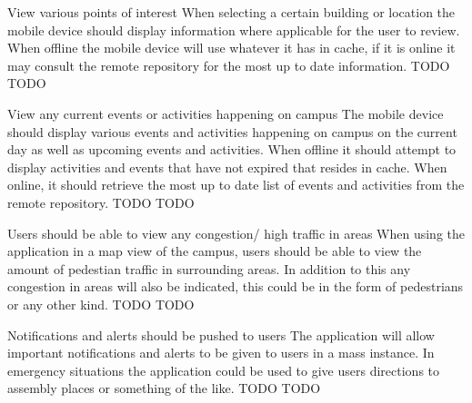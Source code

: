 \FuncReq
{View various points of interest}
{When selecting a certain building or location the mobile device should display information where applicable for the user to review. When offline the mobile device will use whatever it has in cache, if it is online it may consult the remote repository for the most up to date information.}
{TODO}
{TODO}

\FuncReq
{View any current events or activities happening on campus}
{The mobile device should display various events and activities happening on campus on the current day as well as upcoming events and activities. When offline it should attempt to display activities and events that have not expired that resides in cache. When online, it should retrieve the most up to date list of events and activities from the remote repository.}
{TODO}
{TODO}

\FuncReq
{Users should be able to view any congestion/ high traffic in areas}
{When using the application in a map view of the campus, users should be able to view the amount of pedestian traffic in surrounding areas. In addition to this any congestion in areas will also be indicated, this could be in the form of pedestrians or any other kind.}
{TODO}
{TODO}

\FuncReq
{Notifications and alerts should be pushed to users}
{The application will allow important notifications and alerts to be given to users in a mass instance. In emergency situations the application could be used to give users directions to assembly places or something of the like.}
{TODO}
{TODO}
